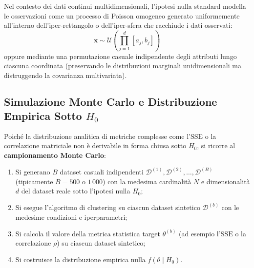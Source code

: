 Nel contesto dei dati continui multidimensionali, l'ipotesi nulla standard modella le osservazioni come un processo di Poisson omogeneo generato uniformemente all'interno dell'iper-rettangolo o dell'iper-sfera che racchiude i dati osservati:
\begin{equation}
\mathbf{x} \sim \mathcal{U}\left(\prod_{j=1}^d [a_j, b_j]\right)
\end{equation}
oppure mediante una permutazione casuale indipendente degli attributi lungo ciascuna coordinata (preservando le distribuzioni marginali unidimensionali ma distruggendo la covarianza multivariata).

\FloatBarrier
\subsection{Simulazione Monte Carlo e Distribuzione Empirica Sotto $H_0$}
Poiché la distribuzione analitica di metriche complesse come l'$\mathrm{SSE}$ o la correlazione matriciale non è derivabile in forma chiusa sotto $H_0$, si ricorre al \textbf{campionamento Monte Carlo}:
\begin{enumerate}
    \item Si generano $B$ dataset casuali indipendenti $\mathcal{D}^{(1)}, \mathcal{D}^{(2)}, \dots, \mathcal{D}^{(B)}$ (tipicamente $B = 500$ o $1\,000$) con la medesima cardinalità $N$ e dimensionalità $d$ del dataset reale sotto l'ipotesi nulla $H_0$;
    \item Si esegue l'algoritmo di clustering su ciascun dataset sintetico $\mathcal{D}^{(b)}$ con le medesime condizioni e iperparametri;
    \item Si calcola il valore della metrica statistica target $\theta^{(b)}$ (ad esempio l'$\mathrm{SSE}$ o la correlazione $\rho$) su ciascun dataset sintetico;
    \item Si costruisce la distribuzione empirica nulla $f(\theta \mid H_0)$.
\end{enumerate}

\FloatBarrier

